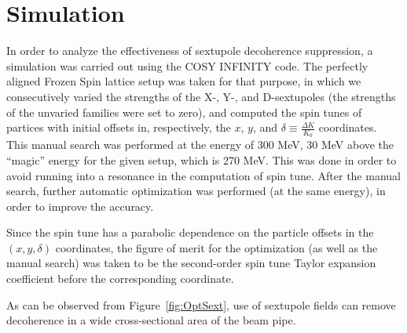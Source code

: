 \documentclass{article}
\begin{document}
\section{Simulation}
In order to analyze the effectiveness of sextupole decoherence suppression, a simulation was carried out using the COSY INFINITY code. The perfectly aligned Frozen Spin lattice setup was taken for that purpose, in which we consecutively varied the strengths of the X-, Y-, and D-sextupoles (the strengths of the unvaried families were set to zero), and computed the spin tunes of partices with initial offsets in, respectively, the $x$, $y$, and $\delta \equiv \frac{\Delta K}{K_0}$ coordinates.~\cite{COSYInf:BPManual} This manual search was performed at the energy of 300 MeV, 30 MeV above the ``magic'' energy for the given setup, which is 270 MeV. This was done in order to avoid running into a resonance in the computation of spin tune. After the manual search, further automatic optimization was performed (at the same energy), in order to improve the accuracy.

Since the spin tune has a parabolic dependence on the particle offsets in the $(x,y,\delta)$ coordinates, the figure of merit for the optimization (as well as the manual search) was taken to be the second-order spin tune Taylor expansion coefficient before the corresponding coordinate.

As can be observed from Figure~\ref{fig:OptSext}, use of sextupole fields can remove decoherence in a wide cross-sectional area of the beam pipe.
\end{document}
